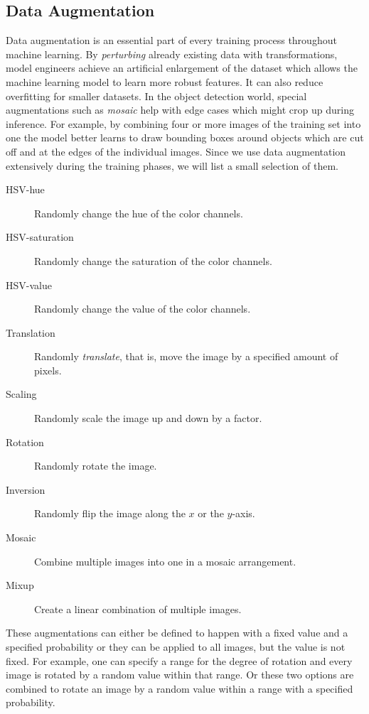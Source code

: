 \documentclass[draft,final]{vutinfth} %
\begin{document}
\subsection{Data Augmentation}
\label{sec:methods-augmentation}

Data augmentation is an essential part of every training process
throughout machine learning. By \emph{perturbing} already existing
data with transformations, model engineers achieve an artificial
enlargement of the dataset which allows the machine learning model to
learn more robust features. It can also reduce overfitting for smaller
datasets. In the object detection world, special augmentations such
as \emph{mosaic} help with edge cases which might crop up during
inference. For example, by combining four or more images of the
training set into one the model better learns to draw bounding boxes
around objects which are cut off and at the edges of the individual
images. Since we use data augmentation extensively during the training
phases, we will list a small selection of them.

\begin{description}
\item[HSV-hue] Randomly change the hue of the color channels.
\item[HSV-saturation] Randomly change the saturation of the color
  channels.
\item[HSV-value] Randomly change the value of the color channels.
\item[Translation] Randomly \emph{translate}, that is, move the image
  by a specified amount of pixels.
\item[Scaling] Randomly scale the image up and down by a factor.
\item[Rotation] Randomly rotate the image.
\item[Inversion] Randomly flip the image along the $x$ or the
  $y$-axis.
\item[Mosaic] Combine multiple images into one in a mosaic
  arrangement.
\item[Mixup] Create a linear combination of multiple images.
\end{description}

These augmentations can either be defined to happen with a fixed value
and a specified probability or they can be applied to all images, but
the value is not fixed. For example, one can specify a range for the
degree of rotation and every image is rotated by a random value within
that range. Or these two options are combined to rotate an image by a
random value within a range with a specified probability.
\end{document}
